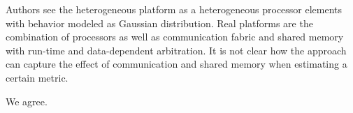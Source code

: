 \begin{reviewer}
Authors see the heterogeneous platform as a heterogeneous processor elements
with behavior modeled as Gaussian distribution. Real platforms are the
combination of processors as well as communication fabric and shared memory with
run-time and data-dependent arbitration. It is not clear how the approach can
capture the effect of communication and shared memory when estimating a certain
metric.
\end{reviewer}

\begin{authors}
We agree.

\begin{actions}
\end{actions}
\end{authors}
